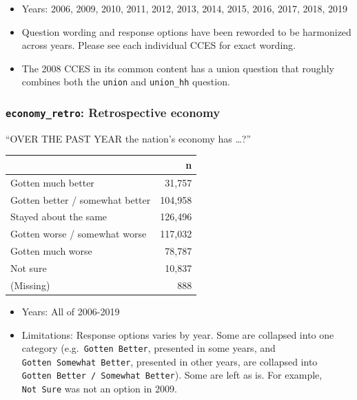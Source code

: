 \documentclass[10pt,article,oneside]{memoir}
\theoremstyle{definition}
\begin{document}
\begin{itemize}
\tightlist
\item
  Years: 2006, 2009, 2010, 2011, 2012, 2013, 2014, 2015, 2016, 2017,
  2018, 2019
\item
  Question wording and response options have been reworded to be
  harmonized across years. Please see each individual CCES for exact
  wording.
\item
  The 2008 CCES in its common content has a union question that roughly
  combines both the \texttt{union} and \texttt{union\_hh} question.
\end{itemize}

\hypertarget{economy_retro-retrospective-economy}{%
\subsubsection{\texorpdfstring{\texttt{economy\_retro}: Retrospective
economy}{economy\_retro: Retrospective economy}}\label{economy_retro-retrospective-economy}}

``OVER THE PAST YEAR the nation's economy has \ldots?''

\begin{table}[H]
\centering
\begin{tabular}{lr}
\toprule
 & n\\
\midrule
Gotten much better & 31,757\\
Gotten better / somewhat better & 104,958\\
Stayed about the same & 126,496\\
Gotten worse / somewhat worse & 117,032\\
Gotten much worse & 78,787\\
Not sure & 10,837\\
(Missing) & 888\\
\bottomrule
\end{tabular}
\end{table}

\begin{itemize}
\tightlist
\item
  Years: All of 2006-2019
\item
  Limitations: Response options varies by year. Some are collapsed into
  one category (e.g.~\texttt{Gotten\ Better}, presented in some years,
  and \texttt{Gotten\ Somewhat\ Better}, presented in other years, are
  collapsed into \texttt{Gotten\ Better\ /\ Somewhat\ Better}). Some are
  left as is. For example, \texttt{Not\ Sure} was not an option in 2009.
\end{itemize}
\end{document}
